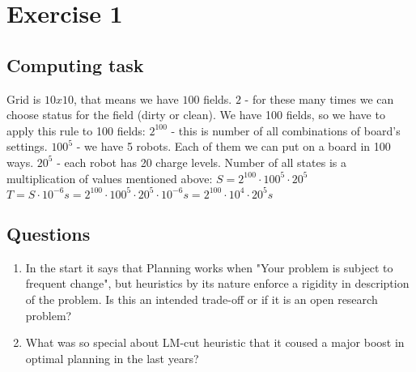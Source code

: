 





\section{Exercise 1}

\subsection{Computing task}

Grid is $10 x 10$, that means we have $100$ fields.
\newline
$2$ - for these many times we can choose status for the field (dirty or clean). We have 100 fields, so
we have to apply this rule to 100 fields:
\newline
$2^{100}$ - this is number of all combinations of board's settings.
\newline
$100^{5}$ - we have 5 robots. Each of them we can put on a board in 100 ways. 
\newline
$20^5$ - each robot has 20 charge levels.
\newline 
Number of all states is a multiplication of values mentioned above: 
$S=2^{100}\cdot100^{5}\cdot20^5$
\newline
$T=S \cdot 10^{-6}s= 2^{100} \cdot 100^{5} \cdot 20^5 \cdot 10^{-6}s = 2^{100} \cdot 10^4 \cdot 20^5s$ 



\subsection{Questions}

\begin{enumerate}
	\item {In the start it says that Planning works when "Your problem is subject to
	 frequent change", but heuristics by its nature enforce a rigidity in description of the problem. 
	 Is this an intended trade-off or if it is an open research problem?}
	\item { What was so special about LM-cut heuristic that it coused a major boost in optimal planning in the last years?}
\end{enumerate}
